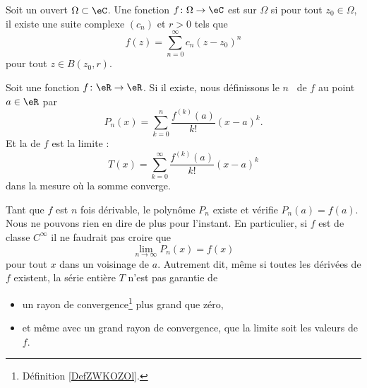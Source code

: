 \begin{definition}      \label{DEFooCLGZooRuEkTe}
	Soit un ouvert \( \Omega\subset \eC\). Une fonction \( f\colon \Omega\to \eC\) est  sur \( \Omega\) si pour tout \( z_0\in\Omega\), il existe une suite complexe \( (c_n)\) et \( r>0\) tels que
	\begin{equation}
		f(z)=\sum_{n=0}^{\infty} c_n(z-z_0)^n
	\end{equation}
	pour tout \( z\in B(z_0,r)\).
\end{definition}

\begin{definition}
	Soit une fonction \( f\colon \eR\to \eR\). Si il existe, nous définissons le \( n\)\ieme\  de \( f\) au point \( a\in \eR\) par
	\begin{equation}
		P_n(x)=\sum_{k=0}^n\frac{ f^{(k)}(a) }{ k! }(x-a)^k.
	\end{equation}
	Et la  de \( f\) est la limite :
	\begin{equation}
		T(x)=\sum_{k=0}^{\infty}\frac{ f^{(k)}(a) }{ k! }(x-a)^k
	\end{equation}
	dans la mesure où la somme converge.
\end{definition}

Tant que \( f\) est \( n\) fois dérivable, le polynôme \( P_n\) existe et vérifie \( P_n(a)=f(a)\). Nous ne pouvons rien en dire de plus pour l'instant. En particulier, si \( f\) est de classe \(  C^{\infty}\) il ne faudrait pas croire que
\begin{equation}
	\lim_{n\to \infty} P_n(x)=f(x)
\end{equation}
pour tout \( x\) dans un voisinage de \( a\). Autrement dit, même si toutes les dérivées de \( f\) existent, la série entière \( T\) n'est pas garantie de
\begin{itemize}
	\item
	      un rayon de convergence\footnote{Définition \ref{DefZWKOZOl}.} plus grand que zéro,
	\item
	      et même avec un grand rayon de convergence, que la limite soit les valeurs de \( f\).
\end{itemize}

